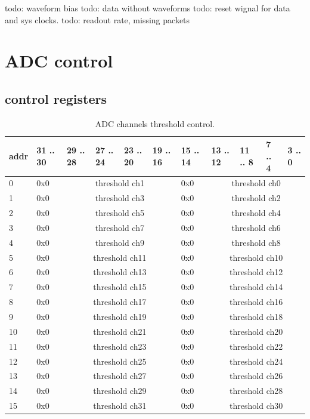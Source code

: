 \documentclass{article}
\begin{document}
todo: waveform bias
todo: data without waveforms
todo: reset wignal for data and sys clocks.
todo: readout rate, missing packets

\section{ADC control}
\subsection{control registers}

\begin{table}[H]
\centering
\begin{tabular}{| l | l | l | l | l | l | l | l | l | l | l |}
\hline
addr & 31 .. 30 & 29 .. 28 & 27 .. 24 & 23 .. 20 & 19 .. 16 & 15 .. 14 & 13 .. 12 & 11 .. 8 & 7 .. 4 & 3 .. 0 \\ \hline
0 & 0x0 & \multicolumn{4}{c|}{threshold ch1} & 0x0 & \multicolumn{4}{c|}{threshold ch0} \\ \hline
1 & 0x0 & \multicolumn{4}{c|}{threshold ch3} & 0x0 & \multicolumn{4}{c|}{threshold ch2} \\ \hline
2 & 0x0 & \multicolumn{4}{c|}{threshold ch5} & 0x0 & \multicolumn{4}{c|}{threshold ch4} \\ \hline
3 & 0x0 & \multicolumn{4}{c|}{threshold ch7} & 0x0 & \multicolumn{4}{c|}{threshold ch6} \\ \hline
4 & 0x0 & \multicolumn{4}{c|}{threshold ch9} & 0x0 & \multicolumn{4}{c|}{threshold ch8} \\ \hline
5 & 0x0 & \multicolumn{4}{c|}{threshold ch11} & 0x0 & \multicolumn{4}{c|}{threshold ch10} \\ \hline
6 & 0x0 & \multicolumn{4}{c|}{threshold ch13} & 0x0 & \multicolumn{4}{c|}{threshold ch12} \\ \hline
7 & 0x0 & \multicolumn{4}{c|}{threshold ch15} & 0x0 & \multicolumn{4}{c|}{threshold ch14} \\ \hline
8 & 0x0 & \multicolumn{4}{c|}{threshold ch17} & 0x0 & \multicolumn{4}{c|}{threshold ch16} \\ \hline
9 & 0x0 & \multicolumn{4}{c|}{threshold ch19} & 0x0 & \multicolumn{4}{c|}{threshold ch18} \\ \hline
10 & 0x0 & \multicolumn{4}{c|}{threshold ch21} & 0x0 & \multicolumn{4}{c|}{threshold ch20} \\ \hline
11 & 0x0 & \multicolumn{4}{c|}{threshold ch23} & 0x0 & \multicolumn{4}{c|}{threshold ch22} \\ \hline
12 & 0x0 & \multicolumn{4}{c|}{threshold ch25} & 0x0 & \multicolumn{4}{c|}{threshold ch24} \\ \hline
13 & 0x0 & \multicolumn{4}{c|}{threshold ch27} & 0x0 & \multicolumn{4}{c|}{threshold ch26} \\ \hline
14 & 0x0 & \multicolumn{4}{c|}{threshold ch29} & 0x0 & \multicolumn{4}{c|}{threshold ch28} \\ \hline
15 & 0x0 & \multicolumn{4}{c|}{threshold ch31} & 0x0 & \multicolumn{4}{c|}{threshold ch30} \\ \hline
\end{tabular}
\caption{ADC channels threshold control.\label{tab2}}
\end{table}
\end{document}
